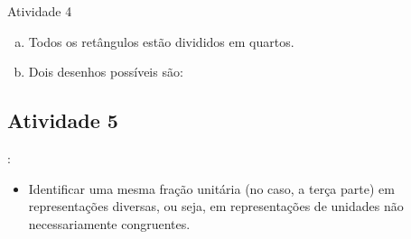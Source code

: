 \begin{multicols}{2}
\begin{resposta*}{Atividade 4}
\begin{enumerate}[a),wide,labelindent=0pt] %
    \item       Todos os retângulos estão divididos em quartos.
    \item       Dois desenhos possíveis são:
\begin{center}
\end{center}
\end{enumerate} %
\end{resposta*}

\Bg
\end{multicols}
\subsection{Atividade 5}
  \vspace{.1cm}:

\begin{itemize} %
    \item       Identificar uma mesma fração unitária (no caso, a terça parte) em representações diversas, ou seja, em representações de unidades não necessariamente congruentes.
\end{itemize} %

 \vspace{.1cm}

